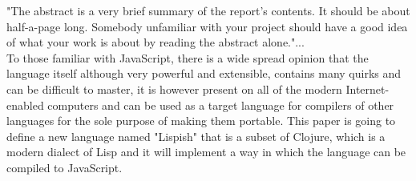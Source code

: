 "The abstract is a very brief summary of the report's contents. It should be about half-a-page long. Somebody unfamiliar with your project should have a good idea of what your work is about by reading the abstract alone."... \\

To those familiar with JavaScript, there is a wide spread opinion that the language itself although very powerful and extensible, contains many quirks and can be difficult to master, it is however present on all of the modern Internet-enabled computers and can be used as a target language for compilers of other languages for the sole purpose of making them portable. 
This paper is going to define a new language named "Lispish" that is a subset of Clojure, which is a modern dialect of Lisp and it will implement a way in which the language can be compiled to JavaScript.